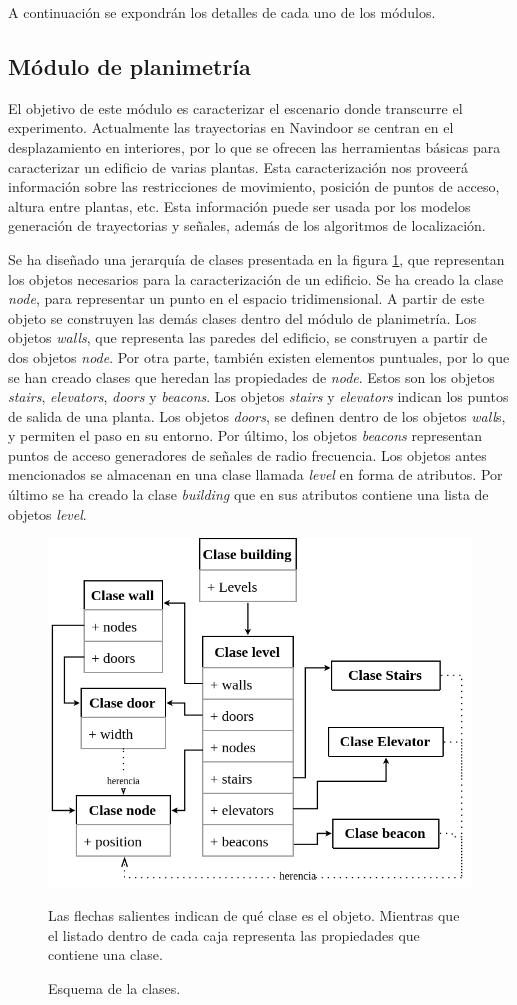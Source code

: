 A continuación se expondrán los detalles de cada uno de los módulos.


\subsection{Módulo de planimetría}

El objetivo de este módulo es caracterizar el escenario donde transcurre el experimento. Actualmente las trayectorias en Navindoor se centran en el desplazamiento en interiores, por lo que se ofrecen las herramientas básicas para caracterizar un edificio de varias plantas. Esta caracterización nos proveerá información sobre las restricciones de movimiento, posición de puntos de acceso, altura entre plantas, etc. Esta información puede ser usada por los modelos generación de trayectorias y señales, además de los algoritmos de localización.

Se ha diseñado una jerarquía de clases presentada en la figura \ref{fig:esquemabuilding}, que representan los objetos necesarios para la caracterización de un edificio. Se ha creado la clase \emph{node}, para representar un punto en el espacio tridimensional. A partir de este objeto se construyen las demás clases dentro del módulo de planimetría. Los objetos \emph{walls}, que representa  las paredes del edificio, se construyen a partir de dos objetos \emph{node}. Por otra parte, también existen  elementos puntuales, por lo que se han creado clases que heredan las propiedades de \emph{node}. Estos son los objetos \emph{stairs}, \emph{elevators}, \emph{doors} y \emph{beacons}. Los objetos \emph{stairs} y \emph{elevators} indican los puntos de salida de una planta. Los objetos \emph{doors}, se definen dentro de los objetos \emph{wall}s, y permiten el paso en su entorno. Por último, los objetos \emph{beacons} representan puntos de acceso generadores de señales de radio frecuencia. Los objetos antes mencionados se almacenan en una clase llamada \emph{level} en forma de atributos. Por último se ha creado la clase \emph{building} que en sus atributos contiene una lista de objetos \emph{level}. 
\begin{figure}[!ht]
    \centering
    \includegraphics[width=0.5     \columnwidth]{img/Design/planimetria.png} 
    \caption[]{Esquema de la clases.}
    \small
    Las flechas salientes indican de qué clase es el objeto. Mientras que el listado dentro de cada caja representa las propiedades que contiene una clase. 
    \label{fig:esquemabuilding}
\end{figure}   


